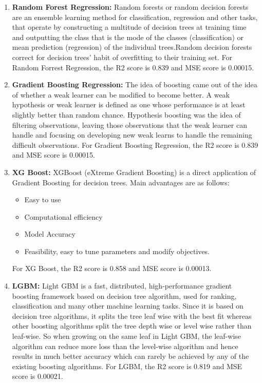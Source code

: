 \begin{enumerate}
 	 \item \textbf{Random Forest Regression:}
 	Random forests or random decision forests are an ensemble learning method for classification, regression and other tasks, that operate by constructing a multitude of decision trees at training time and outputting the class that is the mode of the classes (classification) or mean prediction (regression) of the individual trees.Random decision forests correct for decision trees' habit of overfitting to their training set. For Random Forrest Regression, the R2 score is 0.839 and MSE score is 0.00015.
 	
 	 \item \textbf{Gradient Boosting Regression:}
 	The idea of boosting came out of the idea of whether a weak learner can be modified to become better. A weak hypothesis or weak learner is defined as one whose performance is at least slightly better than random chance. Hypothesis boosting was the idea of filtering observations, leaving those observations that the weak learner can handle and focusing on developing new weak learns to handle the remaining difficult observations. For Gradient Boosting Regression, the R2 score is 0.839 and MSE score is 0.00015.
 	
 	\item \textbf{XG Boost:}
 	XGBoost (eXtreme Gradient Boosting) is a direct application of Gradient Boosting for decision trees. Main advantages are as follows:
 		\begin{itemize}
 			\item Easy to use
 			\item Computational efficiency
 			\item Model Accuracy
 			\item Feasibility, easy to tune parameters and modify objectives.
 		
 		\end{itemize}
 	
 	For XG Boost, the R2 score is 0.858 and MSE score is 0.00013.
 	
 		\item \textbf{LGBM:}
			Light GBM is a fast, distributed, high-performance gradient boosting framework based on decision tree algorithm, used for ranking, classification and many other machine learning tasks. Since it is based on decision tree algorithms, it splits the tree leaf wise with the best fit whereas other boosting algorithms split the tree depth wise or level wise rather than leaf-wise. So when growing on the same leaf in Light GBM, the leaf-wise algorithm can reduce more loss than the level-wise algorithm and hence results in much better accuracy which can rarely be achieved by any of the existing boosting algorithms. For LGBM, the R2 score is 0.819 and MSE score is 0.00021.

\end{enumerate}


